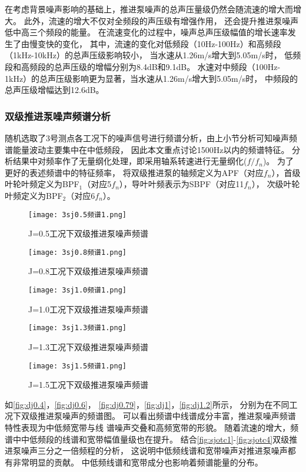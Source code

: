 在考虑背景噪声影响的基础上，推进泵噪声的总声压量级仍然会随流速的增大而增大。
此外，流速的增大不仅对全频段的声压级有增强作用，
还会提升推进泵噪声低中高三个频段的能量。
在流速变化的过程中，噪声总声压级幅值的增长速率发生了由慢变快的变化，
其中，流速的变化对低频段（10Hz-100Hz）和高频段（1kHz-10kHz）的总声压级影响较小，
当水速从1.26m/s增大到5.05m/s时，
低频段和高频段的总声压级的增幅分别为8.4dB和9.1dB。
水速对中频段（100Hz-1kHz）的总声压级影响更为显著，当水速从1.26m/s增大到5.05m/s时，
中频段的总声压级增幅达到12.6dB。
\subsubsection{双级推进泵噪声频谱分析}
随机选取了3号测点各工况下的噪声信号进行频谱分析，由上小节分析可知噪声频谱能量波动主要集中在中低频段，
因此本文重点讨论1500Hz以内的频谱特征。
分析结果中对频率作了无量纲化处理，即采用轴系转速进行无量纲化($f/f_n$)。
为了更好的表述频谱中的特征频率，
将双级推进泵的轴频定义为APF（对应$f_n$），首级叶轮叶频定义为BPF$_1$（对应5$f_n$），导叶叶频表示为SBPF（对应11$f_n$），
次级叶轮叶频定义为BPF$_2$（对应6$f_n$）。
\begin{figure}[htbp]
    \centering
    \texttt{[image: 3sj0.5频谱1.png]}
    \caption{\label{fig:sj0.5}J=0.5工况下双级推进泵噪声频谱}
\end{figure}
\begin{figure}[htbp]
    \centering
    \texttt{[image: 3sj0.8频谱1.png]}
    \caption{\label{fig:sj0.8}J=0.8工况下双级推进泵噪声频谱}
\end{figure}
\begin{figure}[htbp]
    \centering
    \texttt{[image: 3sj1.0频谱1.png]}
    \caption{\label{fig:sj1.0}J=1.0工况下双级推进泵噪声频谱}
\end{figure}
\begin{figure}[htbp]
    \centering
    \texttt{[image: 3sj1.3频谱1.png]}
    \caption{\label{fig:sj1.3}J=1.3工况下双级推进泵噪声频谱}
\end{figure}
\begin{figure}[htbp]
    \centering
    \texttt{[image: 3sj1.5频谱1.png]}
    \caption{\label{fig:sj1.5}J=1.5工况下双级推进泵噪声频谱}
\end{figure}

如\autoref{fig:dj0.4}，\autoref{fig:dj0.6}，
\autoref{fig:dj0.79}，\autoref{fig:dj1}，\autoref{fig:dj1.2}所示，
分别为在不同工况下双级推进泵噪声的频谱图。
可以看出频谱中线谱成分丰富，推进泵噪声频谱特性表现为中低频宽带与线
谱噪声交叠和高频宽带的形貌。
随着流速的增大，频谱中中低频段的线谱和宽带幅值量级也在提升。
结合\autoref{fig:sjotc1}-\autoref{fig:sjotc4}双级推进泵噪声三分之一倍频程的分析，
这说明中低频线谱和宽带噪声对推进泵噪声都有非常明显的贡献。
中低频线谱和宽带成分也影响着频谱能量的分布。

